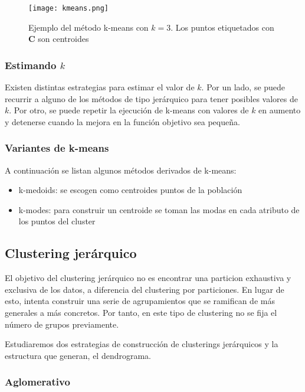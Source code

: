 \documentclass[a4paper,11pt,spanish]{report}
\let\stdsub\subsection
\let\stdsubsub\subsubsection
\renewcommand{\section}{\stdsub}
\renewcommand{\subsection}{\stdsubsub}
\begin{document}
\begin{figure}[htbp]
\centering
\texttt{[image: kmeans.png]}
\caption{\label{fig.km}Ejemplo del método k-means con $k=3$. Los puntos etiquetados con \textbf{C} son centroides}
\end{figure}

\subsection*{Estimando $k$}
\label{sec-1-3-1-2}

Existen distintas estrategias para estimar el valor de $k$. Por un lado, se puede recurrir a alguno de los métodos de tipo jerárquico para tener posibles valores de $k$. Por otro, se puede repetir la ejecución de k-means con valores de $k$ en aumento y detenerse cuando la mejora en la función objetivo sea pequeña.

\subsection*{Variantes de k-means}
\label{sec-1-3-1-3}

A continuación se listan algunos métodos derivados de k-means:
\begin{itemize}
\item k-medoids: se escogen como centroides puntos de la población
\item k-modes: para construir un centroide se toman las modas en cada atributo de los puntos del cluster
\end{itemize}


\section{Clustering jerárquico}
\label{sec-1-3-2}

El objetivo del clustering jerárquico no es encontrar una particion exhaustiva y exclusiva de los datos, a diferencia del clustering por particiones. En lugar de esto, intenta construir una serie de agrupamientos que se ramifican de más generales a más concretos. Por tanto, en este tipo de clustering no se fija el número de grupos previamente.

Estudiaremos dos estrategias de construcción de clusterings jerárquicos y la estructura que generan, el dendrograma.

\subsection*{Aglomerativo}
\label{sec-1-3-2-1}
\end{document}
